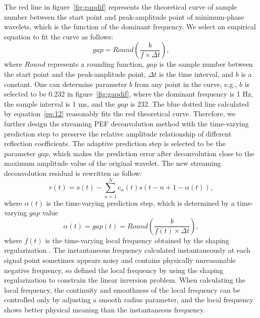 The red line in figure~\ref{fig:gapdif} represents the theoretical curve of
sample number between the start point and peak-amplitude point of
minimum-phase wavelets, which is the function of the dominant frequency.
We select an empirical equation to fit the curve as follows:
\begin{equation}
  \label{eq:13}
  gap=Round(\frac{b}{f\times\Delta t}),
\end{equation}
where $Round$ represents a rounding function, $gap$ is the sample number
between the start point and the peak-amplitude point, $\Delta t$ is the
time interval, and $b$ is a constant. One can determine parameter $b$ from
any point in the curve, e.g., $b$ is selected to be 0.232 in
figure~\ref{fig:gapdif}, where the dominant frequency is 1 Hz, the sample
interval is 1 ms, and the $gap$ is 232. The blue dotted line calculated
by equation~\ref{eq:12} reasonably fits the red theoretical curve.
Therefore, we further design the streaming PEF deconvolution method with
the time-varying prediction step to preserve the relative amplitude
relationship of different reflection coefficients. The adaptive prediction
step is selected to be the parameter $gap$, which makes the prediction error
after deconvolution close to the maximum amplitude value of the original
wavelet. The new streaming deconvolution residual is rewritten as follow:
\begin{equation}
  \label{eq:14}
  r(t)=s(t)-\sum_{n=1}^N c_n(t)s(t-n+1-\alpha (t)),
\end{equation}
where $\alpha(t)$ is the time-varying prediction step, which is determined
by a time-varying $gap$ value
\begin{equation}
  \label{eq:15}
  \alpha(t)=gap(t)=Round(\frac{b}{f(t)\times\Delta t}),
\end{equation}
where $f(t)$ is the time-varying local frequency obtained by the shaping
regularization \cite[]{Fomel07a}. The instantaneous frequency calculated
instantaneously at each signal point sometimes appears noisy and contains
physically unreasonable negative frequency, so \cite{Fomel07a} defined
the local frequency by using the shaping regularization \cite[]{Fomel07b} to
constrain the linear inversion problem. When calculating the local frequency,
the continuity and smoothness of the local frequency can be controlled only
by adjusting a smooth radius parameter, and the local frequency shows better
physical meaning than the instantaneous frequency.


